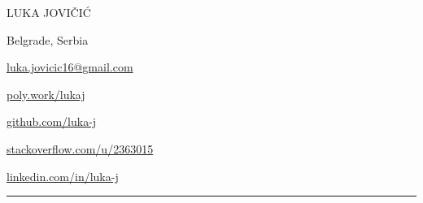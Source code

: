 \begin{center}
{\headerFont\extraLight LUKA \light JOVIČIĆ}
\end{center}
%
%
\begin{center}
\begin{minipage}[b]{\iconsMinipageWidth} %
\faHome\hspace{\iconSpaceBetweenText}Belgrade, Serbia
\end{minipage}%
\begin{minipage}[b]{\iconsMinipageWidth}
\begin{center}
\faEnvelope\hspace{\iconSpaceBetweenText}\href{mailto:luka.jovicic16+cv@gmail.com}{luka.jovicic16@gmail.com}
\end{center}
\end{minipage}%
\begin{minipage}[b]{\iconsMinipageWidth}
\alignRight\faGlobe\hspace{\iconSpaceBetweenText}\href{https://poly.work/lukaj}{poly.work/lukaj} %
\end{minipage}\newline%
%
\vspace{\iconsSpaceBetweenRows}
\begin{minipage}[b]{\iconsMinipageWidth}
\faGithub\hspace{\iconSpaceBetweenText}\href{https://github.com/luka-j}{github.com/luka-j}
\end{minipage}%
\begin{minipage}[b]{\iconsMinipageWidth}
\begin{center}
\faStackOverflow\hspace{\iconSpaceBetweenText}\href{https://stackoverflow.com/u/2363015}{stackoverflow.com/u/2363015}
\end{center}
\end{minipage}%
\begin{minipage}[b]{\iconsMinipageWidth}
\alignRight\faLinkedin\hspace{\iconSpaceBetweenText}\href{https://linkedin.com/in/luka-j}{linkedin.com/in/luka-j} %
\end{minipage}\newline
\end{center}

\vskip -0.75cm  %
\noindent
\hspace{-0.33in}
\rule{1.1\linewidth}{0.2mm}